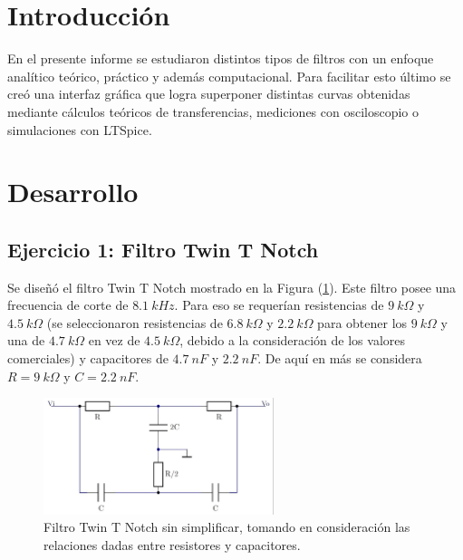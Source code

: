 \documentclass[a4paper]{article}
\begin{document}




\section{Introducción}

En el presente informe se estudiaron distintos tipos de filtros con un enfoque analítico teórico, práctico y además computacional. Para facilitar esto último se creó una interfaz gráfica que logra superponer distintas curvas obtenidas mediante cálculos teóricos de transferencias, mediciones con osciloscopio o simulaciones con LTSpice.

\section{Desarrollo}

\subsection{Ejercicio 1: Filtro Twin T Notch}

Se diseñó el filtro Twin T Notch mostrado en la Figura (\ref{fig:filtroinicial}). Este filtro posee una frecuencia de corte de $ 8.1 \ kHz $. Para eso se requerían resistencias de $ 9 \ k\Omega $ y $ 4.5 \ k\Omega $ (se seleccionaron resistencias de $ 6.8 \ k\Omega $ y $ 2.2 \ k\Omega $ para obtener los $ 9 \ k\Omega $ y una de $ 4.7 \ k\Omega $ en vez de $ 4.5 \ k\Omega $, debido a la consideración de los valores comerciales) y capacitores de $ 4.7 \ nF $ y $ 2.2 \ nF $. De aquí en más se considera $ R = 9 \ k\Omega $ y $ C = 2.2 \ nF $.

\begin{figure}[H]
	\centering
	\includegraphics[width=0.6\textwidth ,trim={0 0.1cm  0.1cm 0},clip]{ej1inicial.jpg}
\caption{Filtro Twin T Notch sin simplificar, tomando en consideración las relaciones dadas entre resistores y capacitores.}
	\label{fig:filtroinicial}
\end{figure}
\end{document}
